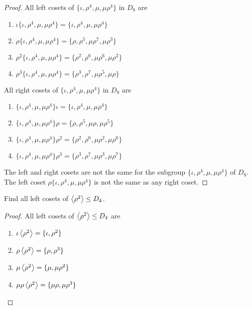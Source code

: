 \begin{proof}
    All left cosets of $\{ \iota, \rho^{4}, \mu, \mu\rho^{4} \}$ in $D_{8}$ are
    \begin{enumerate}[label={(\arabic*)}]
        \item $\iota\{ \iota, \rho^{4}, \mu, \mu\rho^{4} \} = \{ \iota, \rho^{4}, \mu, \mu\rho^{4} \}$
        \item $\rho\{ \iota, \rho^{4}, \mu, \mu\rho^{4} \} = \{ \rho, \rho^{5}, \mu\rho^{7}, \mu\rho^{3} \}$
        \item $\rho^{2}\{ \iota, \rho^{4}, \mu, \mu\rho^{4} \} = \{ \rho^{2}, \rho^{6}, \mu\rho^{6}, \mu\rho^{2} \}$
        \item $\rho^{3}\{ \iota, \rho^{4}, \mu, \mu\rho^{4} \} = \{ \rho^{3}, \rho^{7}, \mu\rho^{5}, \mu\rho \}$
    \end{enumerate}

    All right cosets of $\{ \iota, \rho^{4}, \mu, \mu\rho^{4} \}$ in $D_{8}$ are
    \begin{enumerate}[label={(\arabic*)}]
        \item $\{ \iota, \rho^{4}, \mu, \mu\rho^{4} \}\iota = \{ \iota, \rho^{4}, \mu, \mu\rho^{4} \}$
        \item $\{ \iota, \rho^{4}, \mu, \mu\rho^{4} \}\rho = \{ \rho, \rho^{5}, \mu\rho, \mu\rho^{5} \}$
        \item $\{ \iota, \rho^{4}, \mu, \mu\rho^{4} \}\rho^{2} = \{ \rho^{2}, \rho^{6}, \mu\rho^{2}, \mu\rho^{6} \}$
        \item $\{ \iota, \rho^{4}, \mu, \mu\rho^{4} \}\rho^{3} = \{ \rho^{3}, \rho^{7}, \mu\rho^{3}, \mu\rho^{7} \}$
    \end{enumerate}

    The left and right cosets are not the same for the subgroup $\{ \iota, \rho^{4}, \mu, \mu\rho^{4} \}$ of $D_{8}$. The left coset $\rho\{ \iota, \rho^{4}, \mu, \mu\rho^{4} \}$ is not the same as any right coset.
\end{proof}

\newpage
\begin{exercise}
    Find all left cosets of $\left\langle{\rho^{2}}\right\rangle \leq D_{4}$.
\end{exercise}

\begin{proof}
    All left cosets of $\left\langle{\rho^{2}}\right\rangle \leq D_{4}$ are
    \begin{enumerate}[label={(\arabic*)}]
        \item $\iota\left\langle{\rho^{2}}\right\rangle = \{ \iota, \rho^{2} \}$
        \item $\rho\left\langle{\rho^{2}}\right\rangle = \{ \rho, \rho^{3} \}$
        \item $\mu\left\langle{\rho^{2}}\right\rangle = \{ \mu, \mu\rho^{2} \}$
        \item $\mu\rho\left\langle{\rho^{2}}\right\rangle = \{ \mu\rho, \mu\rho^{3} \}$
    \end{enumerate}
\end{proof}

